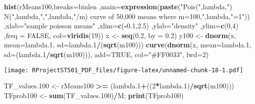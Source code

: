 \documentclass[
]{article}
\newenvironment{Shaded}{\begin{snugshade}}{\end{snugshade}}
\newcommand{\DataTypeTok}[1]{\textcolor[rgb]{0.13,0.29,0.53}{#1}}
\newcommand{\DecValTok}[1]{\textcolor[rgb]{0.00,0.00,0.81}{#1}}
\newcommand{\FloatTok}[1]{\textcolor[rgb]{0.00,0.00,0.81}{#1}}
\newcommand{\KeywordTok}[1]{\textcolor[rgb]{0.13,0.29,0.53}{\textbf{#1}}}
\newcommand{\NormalTok}[1]{#1}
\newcommand{\OperatorTok}[1]{\textcolor[rgb]{0.81,0.36,0.00}{\textbf{#1}}}
\newcommand{\OtherTok}[1]{\textcolor[rgb]{0.56,0.35,0.01}{#1}}
\newcommand{\StringTok}[1]{\textcolor[rgb]{0.31,0.60,0.02}{#1}}
\begin{document}
\begin{Shaded}
\begin{Highlighting}[]
\KeywordTok{hist}\NormalTok{(rMeans100,}\DataTypeTok{breaks=}\NormalTok{binlen ,}\DataTypeTok{main=}\KeywordTok{expression}\NormalTok{(}\KeywordTok{paste}\NormalTok{(}\StringTok{"Pois("}\NormalTok{,lambda,}\StringTok{") ~ N("}\NormalTok{,lambda,}\StringTok{","}\NormalTok{,lambda,}\StringTok{"/m) curve of 50,000 means where m=100,"}\NormalTok{,lambda,}\StringTok{"=1"}\NormalTok{))  ,}\DataTypeTok{xlab=}\StringTok{"sample poisson means"}\NormalTok{ ,}\DataTypeTok{xlim=}\KeywordTok{c}\NormalTok{(}\OperatorTok{-}\FloatTok{0.1}\NormalTok{,}\FloatTok{2.5}\NormalTok{) ,}\DataTypeTok{ylab=}\StringTok{"density"}\NormalTok{ ,}\DataTypeTok{ylim=}\KeywordTok{c}\NormalTok{(}\DecValTok{0}\NormalTok{,}\DecValTok{4}\NormalTok{) ,}\DataTypeTok{freq =} \OtherTok{FALSE}\NormalTok{, }\DataTypeTok{col=}\KeywordTok{viridis}\NormalTok{(}\DecValTok{19}\NormalTok{))}
\NormalTok{x <-}\StringTok{ }\KeywordTok{seq}\NormalTok{(}\DecValTok{0}\NormalTok{,}\DecValTok{2}\NormalTok{, }\DataTypeTok{by =} \FloatTok{0.2}\NormalTok{)}
\NormalTok{y100 <-}\StringTok{ }\KeywordTok{dnorm}\NormalTok{(x, }\DataTypeTok{mean=}\NormalTok{lambda}\FloatTok{.1}\NormalTok{, }\DataTypeTok{sd=}\NormalTok{lambda}\FloatTok{.1}\OperatorTok{/}\NormalTok{(}\KeywordTok{sqrt}\NormalTok{(m100)))}
\KeywordTok{curve}\NormalTok{(}\KeywordTok{dnorm}\NormalTok{(x, }\DataTypeTok{mean=}\NormalTok{lambda}\FloatTok{.1}\NormalTok{, }\DataTypeTok{sd=}\NormalTok{(lambda}\FloatTok{.1}\OperatorTok{/}\KeywordTok{sqrt}\NormalTok{(m100))), }\DataTypeTok{add=}\OtherTok{TRUE}\NormalTok{, }\DataTypeTok{col=}\StringTok{"#FF0033"}\NormalTok{, }\DataTypeTok{lwd=}\DecValTok{2}\NormalTok{)}
\end{Highlighting}
\end{Shaded}

\texttt{[image: RProjectST501\_PDF\_files/figure-latex/unnamed-chunk-18-1.pdf]}

\begin{Shaded}
\begin{Highlighting}[]
\NormalTok{TF_values}\FloatTok{.100}\NormalTok{ <-}\StringTok{ }\NormalTok{rMeans100 }\OperatorTok{>=}\StringTok{ }\NormalTok{(lambda}\FloatTok{.1}\OperatorTok{+}\NormalTok{((}\DecValTok{2}\OperatorTok{*}\NormalTok{lambda}\FloatTok{.1}\NormalTok{)}\OperatorTok{/}\KeywordTok{sqrt}\NormalTok{(m100)))}
\NormalTok{TFprob100 <-}\StringTok{ }\KeywordTok{sum}\NormalTok{(TF_values}\FloatTok{.100}\NormalTok{)}\OperatorTok{/}\NormalTok{M; }\KeywordTok{print}\NormalTok{(TFprob100)}
\end{Highlighting}
\end{Shaded}
\end{document}
